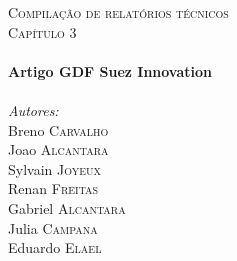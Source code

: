 \center %
 

\textsc{\LARGE Compilação de relatórios técnicos}\\[1.5cm]
\textsc{\Large Capítulo 3}\\[0.5cm] 


\HRule \\[0.4cm]
{ \huge \bfseries Artigo GDF Suez Innovation}\\[0.4cm] %
\HRule \\[1.5cm]
 


\Large \emph{Autores:}\\
Breno \textsc{Carvalho}\\
Joao \textsc{Alcantara}\\
Sylvain \textsc{Joyeux}\\
Renan \textsc{Freitas}\\
Gabriel \textsc{Alcantara}\\
Julia \textsc{Campana}\\
Eduardo \textsc{Elael}\\

